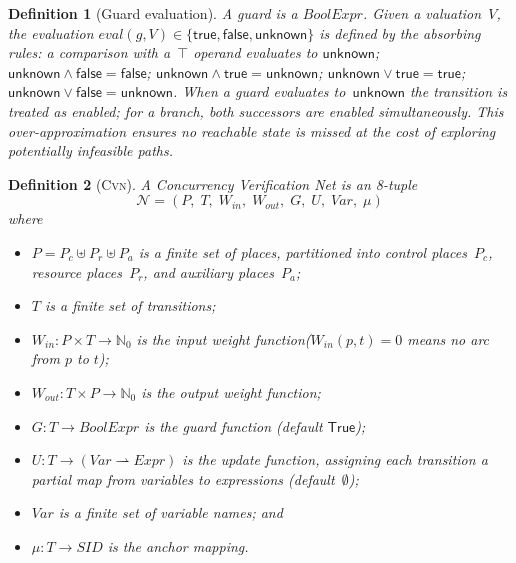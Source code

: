 \documentclass[sigconf]{acmart}
\newtheorem{definition}{Definition}
\begin{document}
\begin{definition}[Guard evaluation]
  \label{def:guard-eval}
  A \emph{guard} is a $\mathit{BoolExpr}$. Given a valuation~$V$, the evaluation $\mathit{eval}(g,V)\in\{\mathsf{true},\mathsf{false},\mathsf{unknown}\}$ is defined by the absorbing rules: a comparison with a~$\top$ operand evaluates to $\mathsf{unknown}$; $\mathsf{unknown}\wedge\mathsf{false}=\mathsf{false}$;\; $\mathsf{unknown}\wedge\mathsf{true}=\mathsf{unknown}$;\; $\mathsf{unknown}\vee\mathsf{true}=\mathsf{true}$;\; $\mathsf{unknown}\vee\mathsf{false}=\mathsf{unknown}$. When a guard evaluates to~$\mathsf{unknown}$ the transition is treated as enabled; for a branch, both successors are enabled   simultaneously. This over-approximation ensures no reachable state is missed at the cost of exploring potentially infeasible paths.
\end{definition}

\begin{definition}[\textsc{Cvn}]
\label{def:cvn}
A Concurrency Verification Net is an 8-tuple
\[
  \mathcal{N}=(P,\;T,\;W_{\!\mathit{in}},\;W_{\!\mathit{out}},\;
    G,\;U,\;\mathit{Var},\;\mu)
\]
where
\begin{itemize}
  \item $P=P_c\uplus P_r\uplus P_a$ is a finite set of \emph{places}, partitioned into control places~$P_c$, resource places~$P_r$, and auxiliary places~$P_a$;
  \item $T$ is a finite set of \emph{transitions};
  \item $W_{\!\mathit{in}}:P\times T\to\mathbb{N}_0$ is the \emph{input weight function}($W_{\!\mathit{in}}(p,t)=0$ means no arc from $p$ to $t$);
  \item $W_{\!\mathit{out}}:T\times P\to\mathbb{N}_0$ is the \emph{output weight function};
  \item $G:T\to\mathit{BoolExpr}$ is the \emph{guard function} (default $\textsf{True}$);
  \item $U:T\to(\mathit{Var}\rightharpoonup\mathit{Expr})$ is the \emph{update function}, assigning each transition a
        partial map from variables to expressions (default~$\emptyset$);
  \item $\mathit{Var}$ is a finite set of variable names; and
  \item $\mu:T\to\mathit{SID}$ is the \emph{anchor mapping}.
\end{itemize}
\end{definition}
\end{document}
